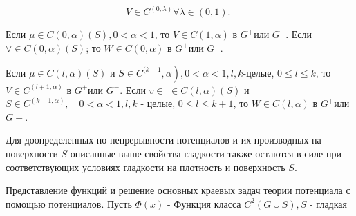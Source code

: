 \documentclass[10pt]{article}
\begin{document}
\[

V \in C^{(0, \lambda)} \forall \lambda \in(0,1) \text {. }

\]



Если $\mu \in C(0, \alpha)(S), 0<\alpha<1$, то $V \in C(1, \alpha)$ в $G^{+}$или $G^{-}$. Если $\vee \in C(0, \alpha)(S)$; то $W \in C(0, \alpha)$ в $G^{+}$или $G^{-}$.



Если $\mu \in C(l, \alpha)(S)$ и $\left.S \in C^{(k+1}, \alpha\right), 0<\alpha<1, l, k$-целые, $0 \leqslant l \leqslant k$, то $V \in C^{(l+1, \alpha)}$ в $G^{+}$или $G^{-}$. Если $v \in$ $\in C(l, \alpha)(S)$ и $S \in C^{(k+1, \alpha)}, \quad 0<\alpha<1, l, k$ - целые, $0 \leqslant l \leqslant k+1$, то $W \in C(l, \alpha)$ в $G^{+}$или $G-$.



Для доопределенных по непрерывности потенциалов и их производных на поверхности $S$ описанные выше свойства гладкости также остаются в силе при соответствующих условиях гладкости на плотность и поверхность $S$.



Представление функций и решение основных краевых задач теории потенциала с помощью потенциалов. Пусть $\Phi(x)$ - Функция класса $C^{2}(G \cup S), S$ - гладкая
\end{document}
